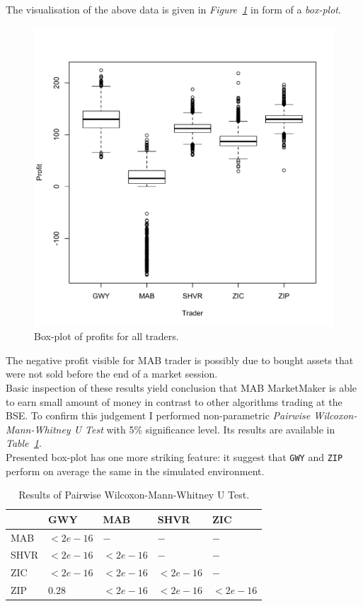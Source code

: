 \documentclass{llncs}
\begin{document}
The visualisation of the above data is given in \emph{Figure~\ref{fig:box}} in form of a \emph{box-plot}.\\

\begin{figure}[ht]
  \centering
  \includegraphics[width=.7\textwidth]{fig/box.pdf}
  \caption{Box-plot of profits for all traders.\label{fig:box}}
\end{figure}

The negative profit visible for MAB trader is possibly due to bought assets that were not sold before the end of a market session.\\
Basic inspection of these results yield conclusion that MAB MarketMaker is able to earn small amount of money in contrast to other algorithms trading at the BSE. To confirm this judgement I performed non-parametric \emph{Pairwise Wilcoxon-Mann-Whitney U Test} with 5\% significance level. Its results are available in \emph{Table~\ref{tab:wilcox}}.\\
Presented box-plot has one more striking feature: it suggest that \texttt{GWY} and \texttt{ZIP} perform on average the same in the simulated environment.\\

\begin{table}[ht]
  \centering
  \begin{tabular}{ p{5em} | p{5em} p{5em} p{5em} p{5em} }
         &GWY    &MAB    &SHVR   &ZIC   \\
    \hline
    MAB  &$<2e-16 $&$-      $&$-      $&$-     $\\
    SHVR &$<2e-16 $&$<2e-16 $&$-      $&$-     $\\
    ZIC  &$<2e-16 $&$<2e-16 $&$<2e-16 $&$-     $\\
    ZIP  &$0.28   $&$<2e-16 $&$<2e-16 $&$<2e-16$
  \end{tabular}
  \vspace*{1em}
  \caption{Results of Pairwise Wilcoxon-Mann-Whitney U Test.\label{tab:wilcox}}
\end{table}
\end{document}
